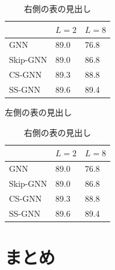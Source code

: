 \documentclass[a4j,twocolumn]{jsarticle}
\begin{document}
\begin{table}[!h]
  \begin{minipage}[!h]{.23\textwidth}
    \begin{center}
      \begin{tabular}{|l|l|l|}
        \hline
        \multicolumn{1}{|c|}{} & \multicolumn{1}{c|}{$L=2$} & \multicolumn{1}{c|}{$L=8$} \\ \hline
        GNN                    & 89.0                       & 76.8                       \\ \hline
        Skip-GNN               & 89.0                       & 86.8                       \\ \hline
        CS-GNN                 & 89.3                       & 88.8                       \\ \hline
        SS-GNN                 & 89.6                       & 89.4                       \\ \hline
      \end{tabular}
    \end{center}
    \caption{左側の表の見出し}
    \label{左側の表のラベル}
  \end{minipage}
  \hfill
  \begin{minipage}[!h]{.23\textwidth}
    \begin{center}
      \begin{tabular}{|l|l|l|}
        \hline
        \multicolumn{1}{|c|}{} & \multicolumn{1}{c|}{$L=2$} & \multicolumn{1}{c|}{$L=8$} \\ \hline
        GNN                    & 89.0                       & 76.8                       \\ \hline
        Skip-GNN               & 89.0                       & 86.8                       \\ \hline
        CS-GNN                 & 89.3                       & 88.8                       \\ \hline
        SS-GNN                 & 89.6                       & 89.4                       \\ \hline
      \end{tabular}
    \end{center}
    \caption{右側の表の見出し}
    \label{右側の表のラベル}
  \end{minipage}
\end{table}

\section{まとめ}
\end{document}
